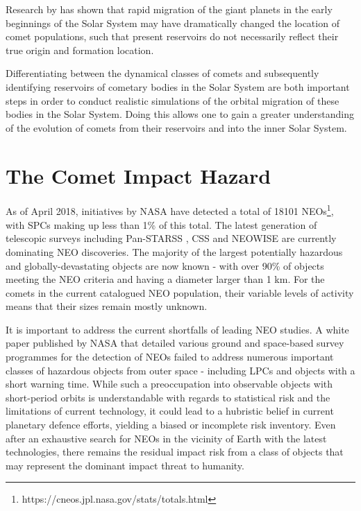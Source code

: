 Research by \cite{2005Natur.435..466G} has shown that rapid migration of the giant planets in the early beginnings of the Solar System may have dramatically changed the location of comet populations, such that present reservoirs do not necessarily reflect their true origin and formation location.

Differentiating between the dynamical classes of comets and subsequently identifying reservoirs of cometary bodies in the Solar System are both important steps in order to conduct realistic simulations of the orbital migration of these bodies in the Solar System. Doing this allows one to gain a greater understanding of the evolution of comets from their reservoirs and into the inner Solar System.

\vspace{-.5ex}
\section{The Comet Impact Hazard}
\label{sec:comet_impact_hazard}


As of April 2018, initiatives by NASA have detected a total of 18101 NEOs\footnote{https://cneos.jpl.nasa.gov/stats/totals.html}, with SPCs making up less than 1\% of this total. The latest generation of telescopic surveys including Pan-STARSS \citep{1538-3873-125-926-357}, CSS \citep{1998BAAS...30.1037L} and NEOWISE \citep{2011ApJ...743..156M} are currently dominating NEO discoveries. The majority of the largest potentially hazardous and globally-devastating objects are now known - with over 90\% of objects meeting the NEO criteria and having a diameter larger than 1 km. For the comets in the current catalogued NEO population, their variable levels of activity means that their sizes remain mostly unknown.

It is important to address the current shortfalls of leading NEO studies. A white paper published by NASA that detailed various ground and space-based survey programmes for the detection of NEOs \citep{united2007near} failed to address numerous important classes of hazardous objects from outer space - including LPCs and objects with a short warning time. While such a preoccupation into observable objects with short-period orbits is understandable with regards to statistical risk and the limitations of current technology, it could lead to a hubristic belief in current planetary defence efforts, yielding a biased or incomplete risk inventory. Even after an exhaustive search for NEOs in the vicinity of Earth with the latest technologies, there remains the residual impact risk from a class of objects that may represent the dominant impact threat to humanity.


